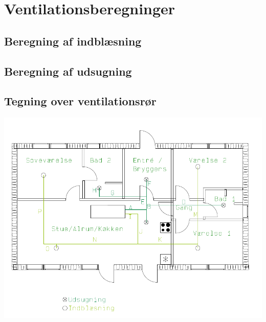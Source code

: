 \section{Ventilationsberegninger}
\label{sec:ventilationsberegninger}

\subsection{Beregning af indblæsning}
\label{sub:indblaesning_beregning}


\subsection{Beregning af udsugning}
\label{sub:udsugning_beregning}

\subsection{Tegning over ventilationsrør} \label{fig:tegning_ventr}
\includegraphics[scale=0.60,angle=90,origin=c]{appendix/ventilation/ventilation_tegning.png}%